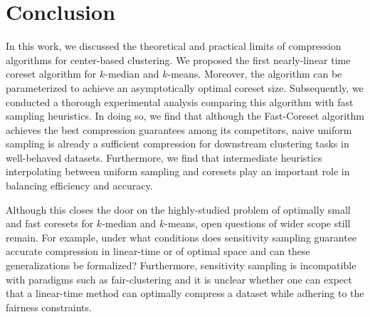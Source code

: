 \section{Conclusion}

In this work, we discussed the theoretical and practical limits of compression algorithms for center-based clustering. We proposed the first nearly-linear time
coreset algorithm for $k$-median and $k$-means. Moreover, the algorithm can be parameterized to achieve an asymptotically optimal coreset size. Subsequently, we
conducted a thorough experimental analysis comparing this algorithm with fast sampling heuristics. In doing so, we find that although the Fast-Coreset algorithm
achieves the best compression guarantees among its competitors, naive uniform sampling is already a sufficient compression for downstream clustering tasks in
well-behaved datasets. Furthermore, we find that intermediate heuristics interpolating between uniform sampling and coresets play an important role in
balancing efficiency and accuracy. 

Although this closes the door on the highly-studied problem of optimally small and fast coresets for $k$-median and $k$-means, open questions of wider scope
still remain. For example, under what conditions does sensitivity sampling guarantee accurate compression in linear-time or of optimal space and can these
generalizations be formalized? Furthermore, sensitivity sampling is incompatible with paradigms such as fair-clustering and it is unclear whether one can
expect that a linear-time method can optimally compress a dataset while adhering to the fairness constraints.
